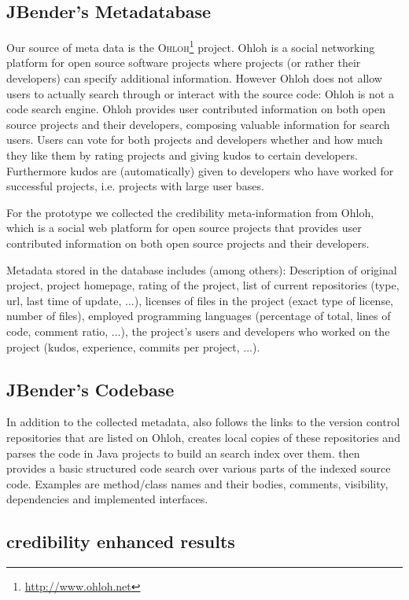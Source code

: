 \documentclass[10pt]{book}
\begin{document}
\subsection{JBender's Metadatabase}
Our source of meta data is the \textsc{Ohloh}\footnote{\url{http://www.ohloh.net}} project. Ohloh is a social networking platform for open source software projects where projects (or rather their developers) can specify additional information. However Ohloh does not allow users to actually search through or interact with the source code: Ohloh is not a code search engine. Ohloh provides user contributed information on both open source projects and their developers, composing valuable information for search users. Users can vote for both projects and developers whether and how much they like them by rating projects and giving kudos to certain developers. Furthermore kudos are (automatically) given to developers who have worked for successful projects, i.e. projects with large user bases. 

For the \Jbd prototype we collected the credibility meta-information from Ohloh, which is a social web platform for open source projects that provides user contributed information on both open source projects and their developers.

Metadata stored in the database includes (among others): Description of original project, project homepage, rating of the project, list of current repositories (type, url, last time of update, ...), licenses of files in the project (exact type of license, number of files), employed programming languages (percentage of total, lines of code, comment ratio, ...), the project's users and developers who worked on the project (kudos, experience, commits per project, ...).

\subsection{JBender's Codebase}
In addition to the collected metadata, \Jbd also follows the links to the version control repositories that are listed on Ohloh, creates local copies of these repositories and parses the code in Java projects to build an search index over them.
\Jbd then provides a basic structured code search over various parts of the indexed source code. Examples are method/class names and their bodies, comments, visibility, dependencies and implemented interfaces.

\subsection{credibility enhanced results}
\end{document}
